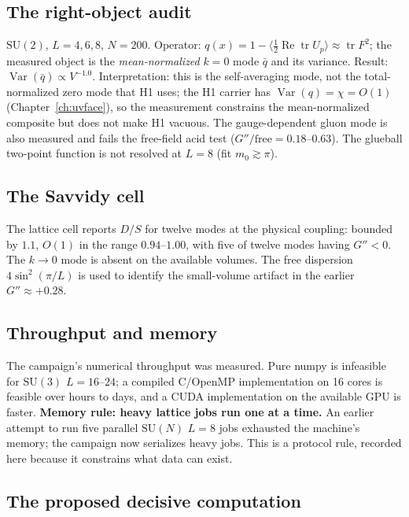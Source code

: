 \subsection{The right-object audit}

$\mathrm{SU}(2)$, $L=4,6,8$, $N=200$. Operator:
$q(x)=1-\langle\tfrac12\operatorname{Re}\operatorname{tr}U_p\rangle\approx\operatorname{tr}F^2$;
the measured object is the \emph{mean-normalized} $k=0$ mode $\bar q$ and its variance. Result:
$\operatorname{Var}(\bar q)\propto V^{-1.0}$. Interpretation: this is the self-averaging mode, not
the total-normalized zero mode that H1 uses; the H1 carrier has
$\operatorname{Var}(q)=\chi=O(1)$ (Chapter~\ref{ch:uvface}), so the measurement constrains the
mean-normalized composite but does not make H1 vacuous. The gauge-dependent gluon mode is also
measured and fails the free-field acid test ($G''/\text{free}=0.18$--$0.63$). The glueball two-point
function is not resolved at $L=8$ (fit $m_0\gtrsim\pi$).

\subsection{The Savvidy cell}

The lattice cell reports $D/S$ for twelve modes at the physical coupling: bounded by $1.1$,
$O(1)$ in the range $0.94$--$1.00$, with five of twelve modes having $G''<0$. The $k\to0$ mode
is absent on the available volumes. The free dispersion $4\sin^2(\pi/L)$ is used to identify
the small-volume artifact in the earlier $G''\approx+0.28$.

\subsection{Throughput and memory}

The campaign's numerical throughput was measured. Pure numpy is infeasible for $\mathrm{SU}(3)$
$L=16$--$24$; a compiled C/OpenMP implementation on 16 cores is feasible over hours to days, and
a CUDA implementation on the available GPU is faster. \textbf{Memory rule: heavy lattice jobs run
one at a time.} An earlier attempt to run five parallel $\mathrm{SU}(N)$ $L=8$ jobs exhausted the
machine's memory; the campaign now serializes heavy jobs. This is a protocol rule, recorded here
because it constrains what data can exist.

\subsection{The proposed decisive computation}

